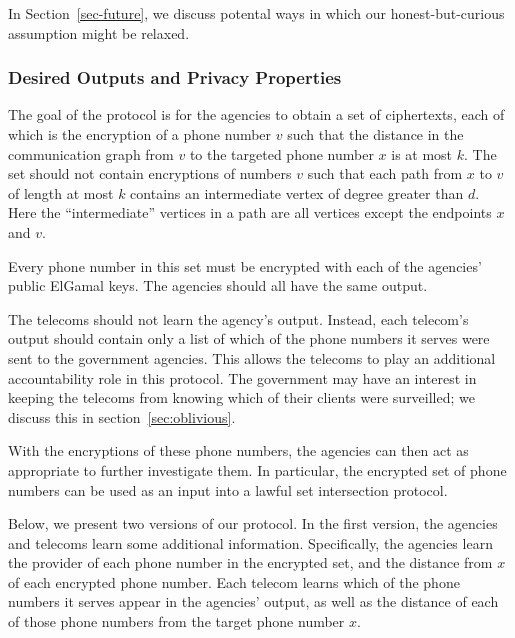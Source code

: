 In Section~\ref{sec-future}, we discuss potental ways in which our honest-but-curious assumption might be relaxed.


\subsubsection{Desired Outputs and Privacy Properties}



The goal of the protocol is for the agencies to obtain a set of ciphertexts, each of which is the encryption of a phone number $v$ such that the distance in the communication graph from $v$ to the targeted phone number $x$ is at most $k$. The set should not contain encryptions of numbers $v$ such that each path from $x$ to $v$ of length at most $k$ contains an intermediate vertex of degree greater than $d$. Here the ``intermediate'' vertices in a path are all vertices except the endpoints $x$ and $v$.



Every phone number in this set must be encrypted with each of the agencies' public ElGamal keys. The agencies should all have the same output.



The telecoms should not learn the agency's output. Instead, each telecom's output should contain only a list of which of the phone numbers it serves were sent to the government agencies. This allows the telecoms to play an additional accountability role in this protocol. The government may have an interest in keeping the telecoms from knowing which of their clients were surveilled; we discuss this in section~\ref{sec:oblivious}.



With the encryptions of these phone numbers, the agencies can then act as appropriate to further investigate them. In particular, the encrypted set of phone numbers can be used as an input into a lawful set intersection protocol.




Below, we present two versions of our protocol. In the first version, the agencies and telecoms learn some additional information. Specifically, the agencies learn the provider of each phone number in the encrypted set, and the distance from $x$ of each encrypted phone number. Each telecom learns which of the phone numbers it serves appear in the agencies' output, as well as the distance of each of those phone numbers from the target phone number $x$.



